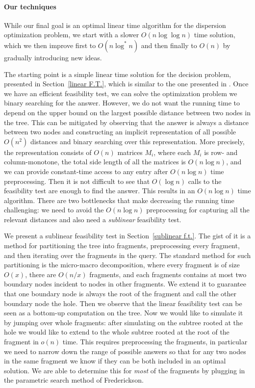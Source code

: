 \documentclass[11pt,a4paper]{article}
\theoremstyle{definition}
\theoremstyle{remark}
\begin{document}
\paragraph{Our techniques}
While our final goal is an optimal linear time algorithm for the dispersion optimization problem, we start
with a slower $O(n\log\log n)$ time solution, which we then improve first to $O(n\log^{*}n)$
and then finally to $O(n)$ by gradually introducing new ideas.

The starting point is a simple linear time solution for the decision problem, presented in Section~\ref{linear F.T.}, 
which is similar to the one presented in \cite{Bhattacharya1991}.
Once we have an efficient feasibility test, we can solve the optimization problem we binary searching for the
answer. However, we do not want the running time to depend on the upper bound on the largest possible
distance between two nodes in the tree.  This can be mitigated by observing that the answer is always
a distance between two nodes and constructing an implicit representation
of all possible $O(n^{2})$ distances and binary searching over this representation. More precisely, the representation
consists of $O(n)$ matrices $M_{i}$, where each $M_{i}$ is row- and column-monotone, the total side length
of all the matrices is $O(n\log n)$, and we can provide constant-time access to any entry after $O(n\log n)$
time preprocessing. Then it is not difficult to see that $O(\log n)$ calls to the feasibility test are enough to
find the answer. This results in an $O(n\log n)$ time algorithm. There are two bottlenecks that make decreasing
the running time challenging: we need to avoid the $O(n\log n)$ preprocessing for capturing all the relevant
distances and also need a \emph{sublinear} feasibility test.

We present a sublinear feasibility test in Section~\ref{sublinear f.t.}. The gist of it is a method for partitioning
the tree into fragments, preprocessing every fragment, and then iterating over the fragments in the query.
The standard method for such partitioning is the micro-macro decomposition, where every fragment is
of size $O(x)$, there are $O(n/x)$ fragments, and each fragments contains at most two boundary nodes
incident to nodes in other fragments. We extend it to guarantee that one boundary node is always the
root of the fragment and call the other boundary node the hole. Then we observe that the linear feasibility test
can be seen as a bottom-up computation on the tree. Now we would like to simulate it by jumping over whole 
fragments: after simulating on the subtree rooted at the hole we would like to extend to the whole
subtree rooted at the root of the fragment in $o(n)$ time. This requires preprocessing the fragments,
in particular we need to narrow down the range of possible answers so that for any two nodes in the same
fragment we know if they can be both included in an optimal solution. We are able to determine this
for \emph{most} of the fragments by plugging in the parametric search method of 
Frederickson\cite{Frederickson1991}. 
\end{document}
